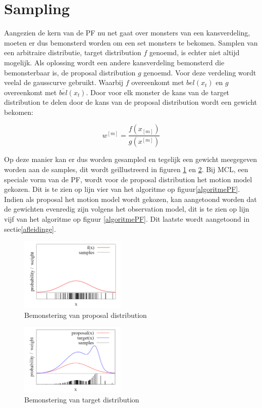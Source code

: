 \documentclass{book}
\begin{document}
\section{Sampling}
\label{sampling}
Aangezien de kern van de PF nu net gaat over monsters van een kansverdeling, moeten er dus bemonsterd worden om een set monsters te bekomen. Samplen van een arbitraire distributie, target distribution $f$ genoemd, is echter niet altijd mogelijk. Als oplossing wordt een andere kansverdeling bemonsterd die bemonsterbaar is, de proposal distribution $g$ genoemd. Voor deze verdeling wordt veelal de gausscurve gebruikt. Waarbij $f$ overeenkomt met $bel(x_{t})$ en $g$ overeenkomt met $\overline{bel}(x_{t})$. Door voor elk monster de kans van de target distribution te delen door de kans van de proposal distribution wordt een gewicht bekomen:

\begin{equation}
w^{[m]}=\dfrac{f(x_{[m]})}{g(x^{[m]})}
\label{gewicht}
\end{equation}

Op deze manier kan er dus worden gesampled en tegelijk een gewicht meegegeven worden aan de samples, dit wordt geïllustreerd in figuren \ref{samples1} en \ref{samples2}.
Bij MCL, een speciale vorm van de PF, wordt voor de proposal distribution het motion model gekozen. Dit is te zien op lijn vier van het algoritme op figuur\ref{algoritmePF}. Indien als proposal het motion model wordt gekozen, kan aangetoond worden dat de gewichten evenredig zijn volgens het observation model, dit is te zien op lijn vijf van het algoritme op figuur \ref{algoritmePF}. Dit laatste wordt aangetoond in sectie\ref{afleidinge}.




\begin{multicols}{2}
	\begin{figure}[H]
	\centering
	\includegraphics[width = 0.45\textwidth]{samples.png}
	\caption{Bemonstering van proposal distribution}
	\label{samples1}
	\end{figure}
	
	\begin{figure}[H]
	\centering
	\includegraphics[width = 0.45\textwidth]{samples2.png}
	\caption{Bemonstering van target distribution}
	\label{samples2}
	\end{figure}
\end{multicols}
\end{document}
